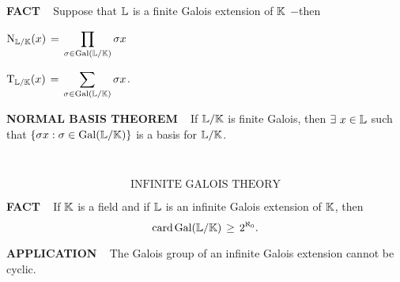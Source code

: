 \vspace{0.1cm}



\begin{x}{\small\bf FACT} \ %
Suppose that $\mathbb{L}$ is a finite Galois extension of $\mathbb{K}$ $-$then

\vspace{0.3cm}

\qquad \textbullet \quad $\text{N}_{\mathbb{L} / \mathbb{K}} (x) \hspace{0.05cm} = \hspace{0.05cm} \displaystyle\prod\limits_{\sigma \in \text{Gal}(\mathbb{L} / \mathbb{K})} \sigma x$

\vspace{0.1cm}

\qquad \textbullet \quad $\text{T}_{\mathbb{L} / \mathbb{K}} (x) \hspace{0.05cm} = \hspace{0.05cm} \displaystyle\sum\limits_{\sigma \in \text{Gal}(\mathbb{L} / \mathbb{K})} \sigma x$.
\end{x}

\vspace{0.1cm}

\begin{x}{\small\bf NORMAL BASIS THEOREM} \ %
If $\mathbb{L} / \mathbb{K}$ is finite Galois, then $\exists \ x \in \mathbb{L}$ such that $\{\sigma x: \sigma \in \text{Gal}(\mathbb{L} / \mathbb{K})\}$ is a basis for $\mathbb{L} / \mathbb{K}$.
\end{x}





\setcounter{theoremn}{0}

\newpage

\ \indent 

\[
\text{INFINITE GALOIS THEORY}
\]

\begin{x}{\small\bf FACT} \ %
If $\mathbb{K}$ is a field and if $\mathbb{L}$ is an infinite Galois extension of $\mathbb{K}$, then 
\[
\text{card}\hspace{0.05cm} \text{Gal}(\mathbb{L} / \mathbb{K}) \hspace{0.05cm} \geq \hspace{0.05cm} 2^{\aleph_0}.
\]
\end{x}

\vspace{0.1cm}


\begin{x}{\small\bf APPLICATION} \ %
The Galois group of an infinite Galois extension cannot be cyclic.
\end{x}

\vspace{0.1cm}

